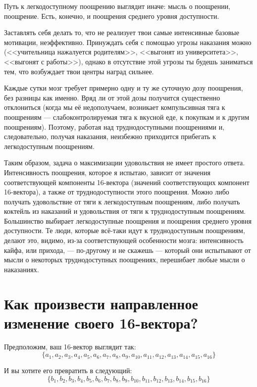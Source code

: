 \documentclass[11pt]{article}
\theoremstyle{remark}
\theoremstyle{definition}
\begin{document}
Путь к легкодоступному поощрению выглядит иначе: мысль о поощрении, поощрение. Есть, конечно, и поощрения среднего уровня доступности.


Заставлять себя делать то, что не реализует твои самые интенсивные базовые мотивации, неэффективно. Принуждать себя с помощью угрозы наказания можно (<<учительница нажалуется родителям>>, <<выгонят из университета>>, <<выгонят с работы>>), однако в отсутствие этой угрозы ты будешь заниматься тем, что возбуждает твои центры наград сильнее. 


Каждые сутки мозг требует примерно одну и ту же суточную дозу поощрения, без разницы как именно. Вряд ли от этой дозы получится существенно отклониться (когда мы её недополучаем, возникает компульсивная тяга к поощрениям --- слабоконтролируемая тяга к вкусной еде, к покупкам и к другим поощрениям). Поэтому, работая над труднодоступными поощрениями и, следовательно, получая наказания, неизбежно приходится прибегать к легкодоступным поощрениям.




Таким образом, задача о максимизации удовольствия не имеет простого ответа. Интенсивность поощрения, которое я испытаю, зависит от значения соответствующей компоненты 16-вектора (значений соответствующих компонент 16-вектора), а также от труднодоступности этого поощрения. Можно либо получать удовольствие от тяги к легкодоступным поощрениям, либо получать коктейль из наказаний и удовольствия от тяги к труднодоступным поощрениям. Большинство выбирает легкодоступные поощрения и поощрения среднего уровня доступности. Те люди, которые всё-таки идут к труднодоступным поощрениям, делают это, видимо, из-за соответствующей особенности мозга: интенсивность кайфа, или прихода, --- по-другому и не скажешь --- который они испытывают от мысли о некоторых труднодоступных поощрениях, перешибает любые мысли о наказаниях.





\section{Как произвести направленное изменение своего 16-вектора?}



Предположим, ваш 16-вектор выглядит так: $$\{ a_1, a_2, a_3, a_4, a_5, a_6, a_7, a_8, a_9, a_{10}, a_{11}, a_{12}, a_{13}, a_{14}, a_{15}, a_{16} \}$$

И вы хотите его превратить в следующий: $$\{ b_1, b_2, b_3, b_4, b_5, b_6, b_7, b_8, b_9, b_{10}, b_{11}, b_{12}, b_{13}, b_{14}, b_{15}, b_{16} \}$$
\end{document}
